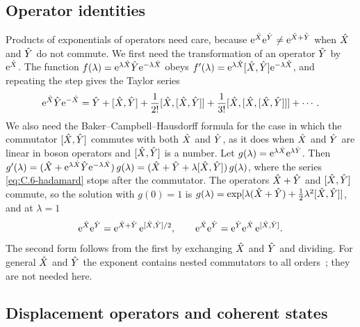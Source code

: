 \subsection{Operator identities}

Products of exponentials of operators need care, because $\mathrm{e}^{\hat{X}}\mathrm{e}^{\hat{Y}} \neq \mathrm{e}^{\hat{X} + \hat{Y}}$ when $\hat{X}$ and $\hat{Y}$ do not commute. We first need the transformation of an operator $\hat{Y}$ by $\mathrm{e}^{\hat{X}}$. The function $f(\lambda) = \mathrm{e}^{\lambda \hat{X}}\hat{Y}\mathrm{e}^{-\lambda \hat{X}}$ obeys $f'(\lambda) = \mathrm{e}^{\lambda \hat{X}}[\hat{X}, \hat{Y}]\mathrm{e}^{-\lambda \hat{X}}$, and repeating the step gives the Taylor series
\begin{equation}
  \mathrm{e}^{\hat{X}}\hat{Y}\mathrm{e}^{-\hat{X}} = \hat{Y} + [\hat{X}, \hat{Y}] + \frac{1}{2!}[\hat{X}, [\hat{X}, \hat{Y}]] + \frac{1}{3!}[\hat{X}, [\hat{X}, [\hat{X}, \hat{Y}]]] + \cdots .
  \label{eq:C.6-hadamard}
\end{equation}
We also need the Baker--Campbell--Hausdorff formula for the case in which the commutator $[\hat{X}, \hat{Y}]$ commutes with both $\hat{X}$ and $\hat{Y}$, as it does when $\hat{X}$ and $\hat{Y}$ are linear in boson operators and $[\hat{X}, \hat{Y}]$ is a number. Let $g(\lambda) = \mathrm{e}^{\lambda \hat{X}}\mathrm{e}^{\lambda \hat{Y}}$. Then $g'(\lambda) = (\hat{X} + \mathrm{e}^{\lambda \hat{X}}\hat{Y}\mathrm{e}^{-\lambda \hat{X}})\,g(\lambda) = (\hat{X} + \hat{Y} + \lambda[\hat{X}, \hat{Y}])\,g(\lambda)$, where the series \cref{eq:C.6-hadamard} stops after the commutator. The operators $\hat{X} + \hat{Y}$ and $[\hat{X}, \hat{Y}]$ commute, so the solution with $g(0) = 1$ is $g(\lambda) = \exp[\lambda(\hat{X} + \hat{Y}) + \tfrac12\lambda^2[\hat{X}, \hat{Y}]]$, and at $\lambda = 1$
\begin{equation}
  \mathrm{e}^{\hat{X}}\mathrm{e}^{\hat{Y}} = \mathrm{e}^{\hat{X} + \hat{Y}}\,\mathrm{e}^{[\hat{X}, \hat{Y}]/2}, \qquad \mathrm{e}^{\hat{X}}\mathrm{e}^{\hat{Y}} = \mathrm{e}^{\hat{Y}}\mathrm{e}^{\hat{X}}\,\mathrm{e}^{[\hat{X}, \hat{Y}]} .
  \label{eq:C.6-BCH}
\end{equation}
The second form follows from the first by exchanging $\hat{X}$ and $\hat{Y}$ and dividing. For general $\hat{X}$ and $\hat{Y}$ the exponent contains nested commutators to all orders~\cite{wilcox1967exponential}; they are not needed here.

\subsection{Displacement operators and coherent states}

